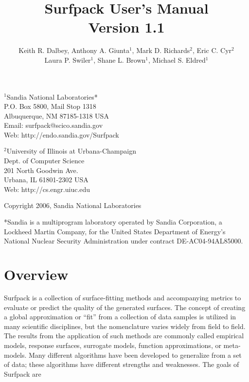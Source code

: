 \documentclass{article}
\begin{document}
\title{Surfpack User's Manual \\ Version 1.1}

\author{Keith R. Dalbey, Anthony A. Giunta$^1$, Mark D. Richards$^2$, Eric C. Cyr$^2$ \\Laura P. Swiler$^1$, Shane L. Brown$^1$, Michael S. Eldred$^1$}

\maketitle


\begin{center}
$^1$Sandia National Laboratories*\\P.O. Box 5800, Mail Stop 1318\\Albuquerque, NM 87185-1318 USA \\
Email: surfpack@scico.sandia.gov \\ Web: http://endo.sandia.gov/Surfpack
\end{center}

\bigbreak

\begin{center}
$^2$University of Illinois at Urbana-Champaign\\Dept. of Computer Science\\201 North Goodwin Ave.\\Urbana, IL 61801-2302 USA\\
Web: http://cs.engr.uiuc.edu
\end{center}

\bigbreak

\begin{center}
Copyright 2006, Sandia National Laboratories
\end{center}

\bigbreak

\begin{center}
*Sandia is a multiprogram laboratory operated by Sandia Corporation, a Lockheed Martin Company, 
for the United States Department of Energy's National Nuclear Security Administration under 
contract DE-AC04-94AL85000.
\end{center}

\pagebreak

\section {Overview}\label{sec:overview}
Surfpack is a collection of surface-fitting methods and accompanying metrics to evaluate or predict the quality of the generated surfaces.  The concept of creating a global approximation or ``fit'' from a collection of data samples is utilized in many scientific disciplines, but the nomenclature varies widely from field to field.  The results from the application of such methods are commonly called empirical models, response surfaces, surrogate models, function approximations, or meta-models.  Many different algorithms have been developed to generalize from a set of data; these algorithms have different strengths and weaknesses.  The goals of Surfpack are
\end{document}
